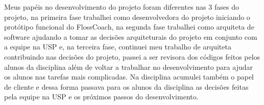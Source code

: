 Meus papéis no desenvolvimento do projeto foram diferentes nas 3 fases do projeto, na 
primeira fase trabalhei como desenvolvedora do projeto iniciando o protótipo funcional
do FlossCoach, na segunda fase trabalhei como arquiteta de software ajudando a tomar as
decisões arquiteturais do projeto em conjunto com a equipe na USP e, na terceira fase,
continuei meu trabalho de arquiteta contribuindo nas decisões do projeto, passei a ser
revisora dos códigos feitos pelos alunos da disciplina além de voltar a trabalhar no
desenvolvimento para ajudar os alunos nas tarefas mais complicadas. Na disciplina 
acumulei também o papel de cliente e dessa forma passava para os alunos da disciplina
as decisões feitas pela equipe na USP e os próximos passos do desenvolvimento. 


